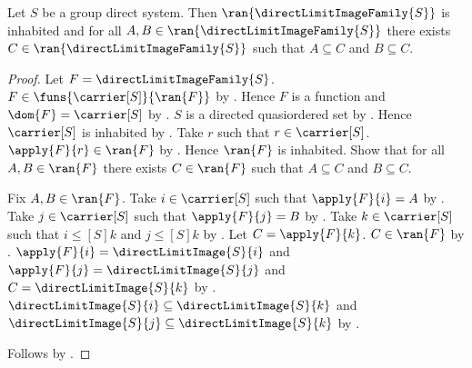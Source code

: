 \begin{theorem}\label{direct_limit_image_family_directed}
    Let $S$ be a group direct system.
    Then $\ran{\directLimitImageFamily{S}}$ is inhabited and
        for all $A,B\in\ran{\directLimitImageFamily{S}}$
        there exists $C\in\ran{\directLimitImageFamily{S}}$ such that
            $A\subseteq C$ and $B\subseteq C$.
\end{theorem}
\begin{proof}
    Let $F=\directLimitImageFamily{S}$.
    $F\in\funs{\carrier[S]}{\ran{F}}$ by
        .
    Hence $F$ is a function and $\dom{F}=\carrier[S]$ by
        .
    $S$ is a directed quasiordered set by
        .
    Hence $\carrier[S]$ is inhabited by
        .
    Take $r$ such that $r\in\carrier[S]$.
    $\apply{F}{r}\in\ran{F}$ by .
    Hence $\ran{F}$ is inhabited.
    Show that for all $A,B\in\ran{F}$ there exists
        $C\in\ran{F}$ such that $A\subseteq C$ and $B\subseteq C$.
    \begin{subproof}
        Fix $A,B\in\ran{F}$.
        Take $i\in\carrier[S]$ such that $\apply{F}{i}=A$ by
            .
        Take $j\in\carrier[S]$ such that $\apply{F}{j}=B$ by
            .
        Take $k\in\carrier[S]$ such that
            $i\mathrel{\leq[S]}k$ and $j\mathrel{\leq[S]}k$ by
            .
        Let $C=\apply{F}{k}$.
        $C\in\ran{F}$ by .
        $\apply{F}{i}=\directLimitImage{S}{i}$ and
            $\apply{F}{j}=\directLimitImage{S}{j}$ and
            $C=\directLimitImage{S}{k}$ by
            .
        $\directLimitImage{S}{i}\subseteq\directLimitImage{S}{k}$ and
            $\directLimitImage{S}{j}\subseteq\directLimitImage{S}{k}$ by
            .
    \end{subproof}
    Follows by \auto.
\end{proof}

